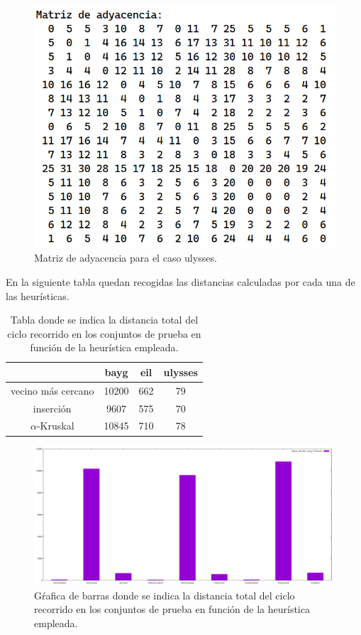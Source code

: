 \begin{figure}[H]
  \centering
  \includegraphics[scale=0.5]{img/ady-ulysses.png}
  \caption{Matriz de adyacencia para el caso ulysses.}
\end{figure}

En la siguiente tabla quedan recogidas las distancias calculadas por cada una de las heurísticas.

\begin{table}[H]
    \centering
    \begin{tabular}{|c|c|c|c|}
      \hline
      & bayg & eil & ulysses \\
      \hline
      vecino más cercano & 10200 & 662 & 79 \\
      \hline
      inserción & 9607 & 575 & 70 \\
      \hline
      $\alpha$-Kruskal & 10845 & 710 & 78 \\
      \hline
    \end{tabular}
    \caption{Tabla donde se indica la distancia total del ciclo recorrido en los conjuntos de prueba
    en función de la heurística empleada.}
\end{table}

\begin{figure}[H]
  \centering
  \includegraphics[scale=0.15]{../src/Comparacion_distancias.pdf}
  \caption{Gŕafica de barras donde se indica la distancia total del ciclo recorrido en los conjuntos de prueba en función de la heurística empleada.}
\end{figure}


